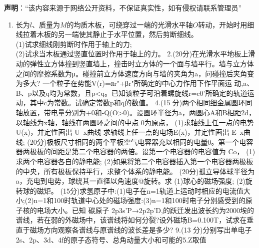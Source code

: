 
\textbf{声明}：“该内容来源于网络公开资料，不保证真实性，如有侵权请联系管理员”
\begin{enumerate}
\item 长为$l$、质量为$M$的均质木板，可绕穿过一端的光滑水平轴$O$转动，开始时用细线拉着木板的另一端使其静止于水平位置，然后剪断细线。\\
(1)试求细线刚剪断时作用于轴上的力;\\
(2)试求当木板通过竖直位置时作用于轴上的力。
2.(20分)在光滑水平地板上滑动的弹性立方体撞到竖直墙上，撞击时立方体的一个面与墙平行。墙与立方体之间的摩擦系数为μ。碰撞前立方体速度方向与墙的夹角为a，问碰撞后夹角变为多大?
一个粒子在势能V(r)=αr"+βr"所确定的中心力作用下作平面运
动,a、B、p以及q均为常数，且p<q。已知该粒子可沿着螺旋线r=c0’所确定的轨道运动，其中c为常数。试确定常数p和q的数值。
4.(15 分)两个相同细金属圆环同轴放置，带电量分别为+0和-Q(O>0)。设圆环半径为a，两圆心A和B相距2d，以轴线为x轴，轴线在两圆环之间的中点 0为原点，
(1)求轴线上任一点的电势 U(x)，并定性画出 U~x曲线
求轴线上任一点的电场E(x)，并定性画出 E~x曲线;
(20分)极板尺寸相同的两个平板空气电容器充以相同的电量0。第一个电容器两极板的间距是第二个电容器的两倍。设第一个电容器的电容值为 Co，
(1)求两个电容器各自的静电能;
(2)如果将第二个电容器插入第一个电容器两极板的中央，所有极板保持平行，求整个体系的静电能。
(20分)孤立导体球半径为a，充电到电势，球绕其一直径以角速度@旋转。求
(1)球心的磁场强度;
(2)旋转球的磁矩。
(15分)求氢原子中:(1)电子在n=1轨道上运动时相应的电流值大小;(2)n=1和100时轨道中心处的磁场强度:(3)n=1和100时电子分别感受到的原子核的电场大小。已知
碳原子 2p3s'P→2p2p'D,的跃迁发出波长约为2000埃的谱线，若在弱的外磁场中，该谱线将如何分裂?设外磁场B=0.100T，试求在垂直于磁场方向观察各谱线与原谱线的波长差是多少?
9.(13 分)分别写出单电子2s、2p、3d、4f的原子态符号、总角动量大小和可能的5.Z取值
\end{enumerate}